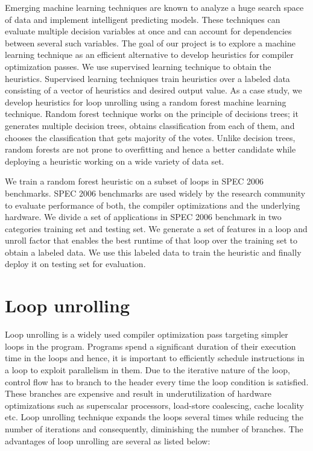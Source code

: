 \documentclass[]{sig-alternate}
\begin{document}
Emerging machine learning techniques are known to analyze a huge search space of data and implement intelligent predicting models. These techniques can evaluate multiple decision variables at once and can account for dependencies between several such variables. The goal of our project is to explore a machine learning technique as an efficient alternative to develop heuristics for compiler optimization passes. We use supervised learning technique to obtain the heuristics. Supervised learning techniques train heuristics over a labeled data consisting of a vector of heuristics and desired output value. As a case study, we develop heuristics for loop unrolling using a random forest machine learning technique.
Random forest technique works on the principle of decisions trees; it generates multiple decision trees, obtains classification from each of them, and chooses the classification that gets majority of the votes. Unlike decision trees, random forests are not prone to overfitting and hence a better candidate while deploying a heuristic working on a wide variety of data set.

We train a random forest heuristic on a subset of loops in SPEC 2006 benchmarks. SPEC 2006 benchmarks are used widely by the research community to evaluate performance of both, the compiler optimizations and the underlying hardware. We divide a set of applications in SPEC 2006 benchmark in two categories  training set and testing set. We generate a set of features in a loop and unroll factor that enables the best runtime of that loop over the training set to obtain a labeled data. We use this labeled data to train the heuristic and finally deploy it on testing set for evaluation.


\section{Loop unrolling}\label{sec:unroll}
Loop unrolling is a widely used compiler optimization pass targeting simpler loops in the program. Programs spend a significant duration of their execution time in the loops and hence, it is important to efficiently schedule instructions in a loop to exploit parallelism in them. Due to the iterative nature of the loop, control flow has to branch to the header every time the loop condition is satisfied. These branches are expensive and result in underutilization of hardware optimizations such as superscalar processors, load-store coalescing, cache locality etc. Loop unrolling technique expands the loops several times while reducing the number of iterations and consequently, diminishing the number of branches. The advantages of loop unrolling are several as listed below:
\end{document}

